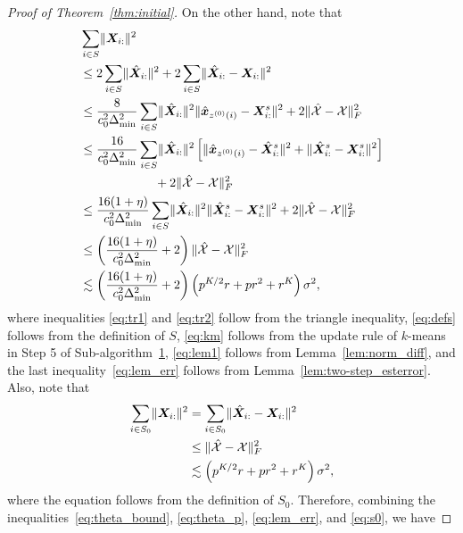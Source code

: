 \documentclass[journal]{IEEEtran}
\theoremstyle{definition}
\theoremstyle{definition}
\newcommand{\of}[1]{\left(#1\right)}
\newcommand{\off}[1]{\left[#1\right]}
\begin{document}
\begin{proof}[Proof of Theorem~\ref{thm:initial}]
    On the other hand, note that 
    \begin{align}
         &\sum_{i \in S} \onormSize{}{\mX_{i:}}^2\\
         & \leq 2 \sum_{i \in S} \onormSize{}{\hat \mX_{i:}}^2  +  2\sum_{i \in S} \onormSize{}{\hat \mX_{i:} - \mX_{i:}}^2 \label{eq:tr1}\\
         & \leq \frac{8}{c_0^2 \Delta_{\min}^2  } \sum_{i \in S} \onormSize{}{\hat \mX_{i:}}^2   \onormSize{}{\hat \mx_{z^{(0)}(i)} - \mX_{i:}^s }^2 
          +2 \onormSize{}{\hat \tX - \tX}_F^2 \label{eq:defs} \\
         & \leq \frac{16}{c_0^2 \Delta_{\min}^2  }\sum_{i \in S} \onormSize{}{\hat \mX_{i:}}^2  \off{ \onormSize{}{\hat \mx_{z^{(0)}(i)} - \hat \mX_{i:}^s }^2 + \onormSize{}{\hat \mX_{i:}^s - \mX_{i:}^s }^2 } \\
         & \quad \quad \quad \quad \quad \quad + 2\onormSize{}{\hat \tX - \tX}_F^2 \label{eq:tr2} \\
         & \leq  \frac{16(1 + \eta)}{c_0^2 \Delta_{\min}^2 }\sum_{i \in S} \onormSize{}{\hat \mX_{i:}}^2  \onormSize{}{\hat \mX_{i:}^s - \mX_{i:}^s }^2  + 2\onormSize{}{\hat \tX - \tX}_F^2 \label{eq:km} \\
         & \leq \of{ \frac{16(1 + \eta)}{c_0^2 \Delta_{\min}^2 } + 2 }\onormSize{}{\hat \tX - \tX}_F^2 \label{eq:lem1}\\
         & \lesssim \of{ \frac{16(1 + \eta)}{c_0^2 \Delta_{\min}^2 } + 2 } \of{ p^{K/2}r + pr^2 + r^K } \sigma^2 \label{eq:lem_err},
    \end{align}
    where inequalities \eqref{eq:tr1} and \eqref{eq:tr2} follow from the triangle inequality, \eqref{eq:defs} follows from the definition of $S$, \eqref{eq:km} follows from the update rule of $k$-means in Step 5 of Sub-algorithm~\hyperref[alg:main]{1}, \eqref{eq:lem1} follows from Lemma~\ref{lem:norm_diff}, and the last inequality~\eqref{eq:lem_err} follows from Lemma~\ref{lem:two-step_esterror}. Also, note that 
    \begin{align}
        \sum_{i \in S_0} \onormSize{}{\mX_{i:}}^2 &=  \sum_{i \in S_0} \onormSize{}{\hat \mX_{i:}- \mX_{i:}}^2 \\
        &\leq \onormSize{}{\hat \tX - \tX}_F^2 \\
        &\lesssim \of{ p^{K/2}r + pr^2 + r^K } \sigma^2,\label{eq:s0}
    \end{align}
    where the equation follows from the definition of $S_0$. Therefore, combining the inequalities~\eqref{eq:theta_bound}, \eqref{eq:theta_p}, \eqref{eq:lem_err}, and \eqref{eq:s0}, we have 

\end{proof}
\end{document}
